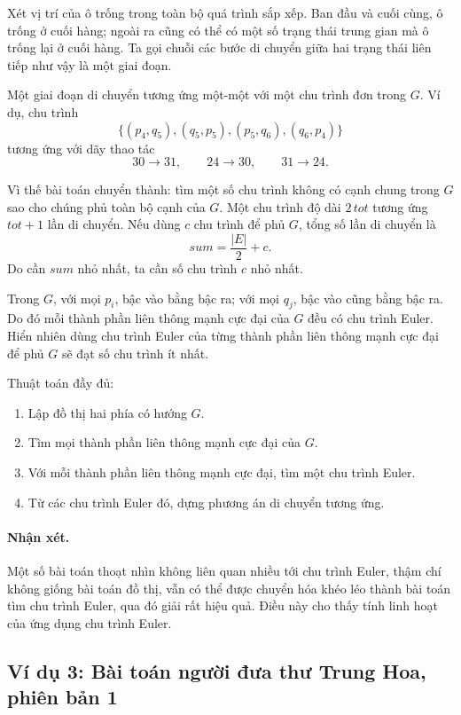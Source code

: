 \documentclass[11pt]{article}
\begin{document}
Xét vị trí của ô trống trong toàn bộ quá trình sắp xếp. Ban đầu và cuối cùng,
ô trống ở cuối hàng; ngoài ra cũng có thể có một số trạng thái trung gian mà
ô trống lại ở cuối hàng. Ta gọi chuỗi các bước di chuyển giữa hai trạng thái
liên tiếp như vậy là một giai đoạn.

Một giai đoạn di chuyển tương ứng một-một với một chu trình đơn trong \(G\).
Ví dụ, chu trình
\[
  \{(p_4,q_5),(q_5,p_5),(p_5,q_6),(q_6,p_4)\}
\]
tương ứng với dãy thao tác
\[
  30\to31,\qquad 24\to30,\qquad 31\to24.
\]

Vì thế bài toán chuyển thành: tìm một số chu trình không có cạnh chung trong
\(G\) sao cho chúng phủ toàn bộ cạnh của \(G\). Một chu trình độ dài
\(2\,\mathit{tot}\) tương ứng \(\mathit{tot}+1\) lần di chuyển. Nếu dùng \(c\)
chu trình để phủ \(G\), tổng số lần di chuyển là
\[
  \mathit{sum}=\frac{|E|}{2}+c.
\]
Do cần \(\mathit{sum}\) nhỏ nhất, ta cần số chu trình \(c\) nhỏ nhất.

Trong \(G\), với mọi \(p_i\), bậc vào bằng bậc ra; với mọi \(q_j\), bậc vào
cũng bằng bậc ra. Do đó mỗi thành phần liên thông mạnh cực đại của \(G\) đều
có chu trình Euler. Hiển nhiên dùng chu trình Euler của từng thành phần liên
thông mạnh cực đại để phủ \(G\) sẽ đạt số chu trình ít nhất.

Thuật toán đầy đủ:
\begin{enumerate}
  \item Lập đồ thị hai phía có hướng \(G\).
  \item Tìm mọi thành phần liên thông mạnh cực đại của \(G\).
  \item Với mỗi thành phần liên thông mạnh cực đại, tìm một chu trình Euler.
  \item Từ các chu trình Euler đó, dựng phương án di chuyển tương ứng.
\end{enumerate}

\paragraph{Nhận xét.}
Một số bài toán thoạt nhìn không liên quan nhiều tới chu trình Euler, thậm chí
không giống bài toán đồ thị, vẫn có thể được chuyển hóa khéo léo thành bài
toán tìm chu trình Euler, qua đó giải rất hiệu quả. Điều này cho thấy tính
linh hoạt của ứng dụng chu trình Euler.

\subsection{Ví dụ 3: Bài toán người đưa thư Trung Hoa, phiên bản 1}
\end{document}
